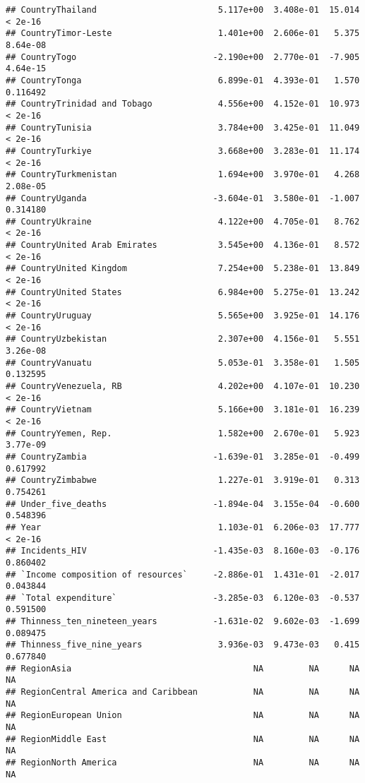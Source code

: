 \documentclass[
]{article}
\begin{document}
\begin{verbatim}
## CountryThailand                        5.117e+00  3.408e-01  15.014  < 2e-16
## CountryTimor-Leste                     1.401e+00  2.606e-01   5.375 8.64e-08
## CountryTogo                           -2.190e+00  2.770e-01  -7.905 4.64e-15
## CountryTonga                           6.899e-01  4.393e-01   1.570 0.116492
## CountryTrinidad and Tobago             4.556e+00  4.152e-01  10.973  < 2e-16
## CountryTunisia                         3.784e+00  3.425e-01  11.049  < 2e-16
## CountryTurkiye                         3.668e+00  3.283e-01  11.174  < 2e-16
## CountryTurkmenistan                    1.694e+00  3.970e-01   4.268 2.08e-05
## CountryUganda                         -3.604e-01  3.580e-01  -1.007 0.314180
## CountryUkraine                         4.122e+00  4.705e-01   8.762  < 2e-16
## CountryUnited Arab Emirates            3.545e+00  4.136e-01   8.572  < 2e-16
## CountryUnited Kingdom                  7.254e+00  5.238e-01  13.849  < 2e-16
## CountryUnited States                   6.984e+00  5.275e-01  13.242  < 2e-16
## CountryUruguay                         5.565e+00  3.925e-01  14.176  < 2e-16
## CountryUzbekistan                      2.307e+00  4.156e-01   5.551 3.26e-08
## CountryVanuatu                         5.053e-01  3.358e-01   1.505 0.132595
## CountryVenezuela, RB                   4.202e+00  4.107e-01  10.230  < 2e-16
## CountryVietnam                         5.166e+00  3.181e-01  16.239  < 2e-16
## CountryYemen, Rep.                     1.582e+00  2.670e-01   5.923 3.77e-09
## CountryZambia                         -1.639e-01  3.285e-01  -0.499 0.617992
## CountryZimbabwe                        1.227e-01  3.919e-01   0.313 0.754261
## Under_five_deaths                     -1.894e-04  3.155e-04  -0.600 0.548396
## Year                                   1.103e-01  6.206e-03  17.777  < 2e-16
## Incidents_HIV                         -1.435e-03  8.160e-03  -0.176 0.860402
## `Income composition of resources`     -2.886e-01  1.431e-01  -2.017 0.043844
## `Total expenditure`                   -3.285e-03  6.120e-03  -0.537 0.591500
## Thinness_ten_nineteen_years           -1.631e-02  9.602e-03  -1.699 0.089475
## Thinness_five_nine_years               3.936e-03  9.473e-03   0.415 0.677840
## RegionAsia                                    NA         NA      NA       NA
## RegionCentral America and Caribbean           NA         NA      NA       NA
## RegionEuropean Union                          NA         NA      NA       NA
## RegionMiddle East                             NA         NA      NA       NA
## RegionNorth America                           NA         NA      NA       NA

\end{verbatim}
\end{document}
